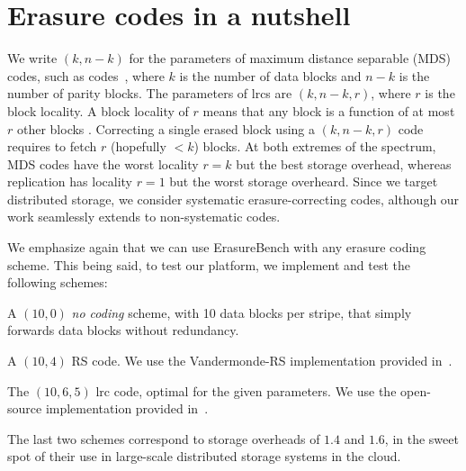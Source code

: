 \section{Erasure codes in a nutshell}
\label{sec:codes}

We write $(k,n-k)$ for the parameters of maximum distance separable (MDS) codes, such as  codes~\autocite{reed-solomon}, where $k$ is the number of data blocks and $n-k$ is the number of parity blocks. 
The parameters of \acp{lrc} are  $(k,n-k,r)$, where $r$ is the block locality. 
A block locality of $r$ means that any block is a function of at most $r$ other blocks \autocite{XorbasVLDB}. Correcting a single erased block using a $(k,n-k,r)$ code requires to fetch $r$ (hopefully $<k$) blocks. 
At both extremes of the spectrum, MDS codes have the worst locality $r=k$ but the best storage overhead, whereas replication has locality $r=1$ but the worst storage overheard. 
Since we target distributed storage, we consider systematic erasure-correcting codes, although our work seamlessly extends to non-systematic codes. %

We emphasize again that we can use ErasureBench with any erasure coding scheme. This being said, to test our platform, we implement and test the following schemes:
\begin{description}
\item[\textbf{NC}] A $(10,0)$ \emph{no coding} scheme, with 10 data blocks per stripe, that simply forwards data blocks without redundancy. %
\item[\textbf{\acs{rs}}] A $(10,4)$ RS code. We use the Vandermonde-RS implementation provided in~\autocite{XorbasVLDB}.  
\item[\textbf{\acs{lrc}}] The $(10,6,5)$ \acs{lrc} code, optimal for the given parameters. We use the open-source implementation provided in~\autocite{XorbasVLDB}.
\end{description}
The last two schemes correspond to storage overheads of $1.4$ and $1.6$, in the sweet spot of their use in large-scale distributed storage systems in the cloud.
